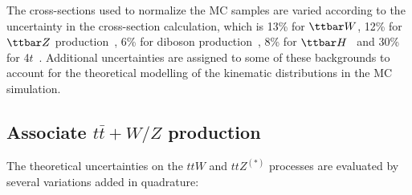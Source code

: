 The cross-sections used to normalize the MC samples are varied according to the uncertainty in the 
cross-section calculation, which is 13\% for $\ttbar W$, 12\% for $\ttbar Z$ production~\cite{YR4}, 6\% for diboson
production~\cite{ATL-PHYS-PUB-2016-002}, 8\% for $\ttbar H$~\cite{YR4} and 30\% for 4$t$~\cite{Alwall:2014hca}. 
Additional uncertainties are assigned to some of these backgrounds to account for the theoretical modelling of the kinematic 
distributions in the MC simulation.

\subsection*{Associate $t\bar t+W/Z$ production}

The theoretical uncertainties on the $ttW$ and $ttZ^{(*)}$ processes are evaluated by several variations added in quadrature:

